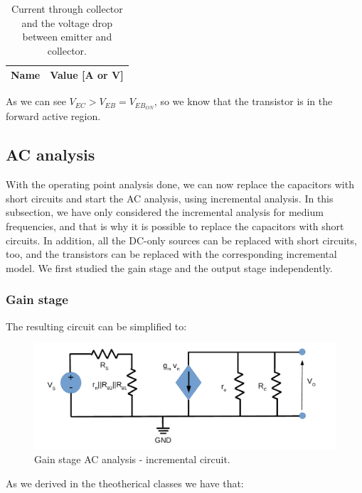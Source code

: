 \begin{table}[h]
    \centering
    \begin{tabular}{|l|r|}
      \hline
      {\bf Name} & {\bf Value [A or V]} \\ \hline
      
    \end{tabular}
    \caption{Current through collector and the voltage drop between emitter and collector.}
    \label{tab:op2_tab}
  \end{table}

As we can see $V_{EC} > V_{EB}=V_{EB_{ON}}$, so we know that the transistor is in the forward active region.

\subsection{AC analysis}
With the operating point analysis done, we can now replace the capacitors with short circuits and start the AC analysis, using incremental analysis. 
In this subsection, we have only considered the incremental analysis for medium frequencies, and that is why it is possible to replace the capacitors with short circuits. 
In addition, all the DC-only sources can be replaced with short circuits, too, and the transistors can be replaced with the corresponding incremental model. 
We first studied the gain stage and the output stage independently.

\subsubsection{Gain stage}
The resulting circuit can be simplified to:

\begin{figure}[h] \centering
    \includegraphics[scale=0.7]{lab4_AC1.pdf}
    \caption{Gain stage AC analysis - incremental circuit.}
    \label{fig:AC1 analysis}
\end{figure}

As we derived in the theotherical classes we have that:


